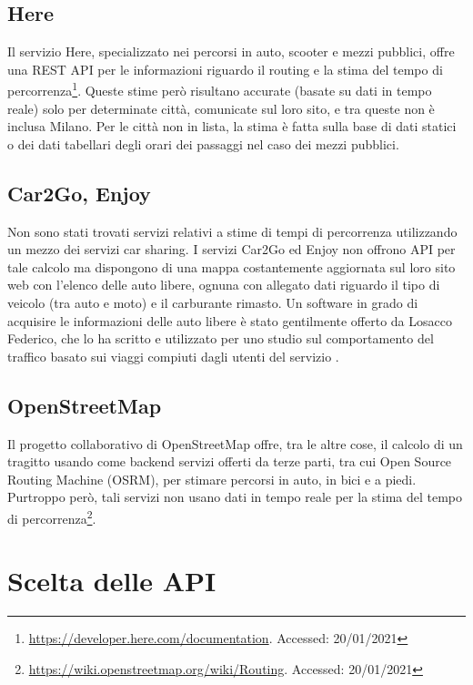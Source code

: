 \subsection{Here}

Il servizio Here, specializzato nei percorsi in auto, scooter e mezzi pubblici, offre una REST API per le informazioni riguardo il routing e la stima del tempo di percorrenza\footnote{\url{https://developer.here.com/documentation}. Accessed: 20/01/2021}. Queste stime però risultano accurate (basate su dati in tempo reale) solo per determinate città, comunicate sul loro sito, e tra queste non è inclusa Milano. Per le città non in lista, la stima è fatta sulla base di dati statici o dei dati tabellari degli orari dei passaggi nel caso dei mezzi pubblici.

\subsection{Car2Go, Enjoy}

Non sono stati trovati servizi relativi a stime di tempi di percorrenza utilizzando un mezzo dei servizi car sharing. I servizi Car2Go ed Enjoy non offrono API per tale calcolo ma dispongono di una mappa costantemente aggiornata sul loro sito web con l'elenco delle auto libere, ognuna con allegato dati riguardo il tipo di veicolo (tra auto e moto) e il carburante rimasto. Un software in grado di acquisire le informazioni delle auto libere è stato gentilmente offerto da Losacco Federico, che lo ha scritto e utilizzato per uno studio sul comportamento del traffico basato sui viaggi compiuti dagli utenti del servizio \cite{trentini2017sampling}.

\subsection{OpenStreetMap}

Il progetto collaborativo di OpenStreetMap offre, tra le altre cose, il calcolo di un tragitto usando come backend servizi offerti da terze parti, tra cui Open Source Routing Machine (OSRM), per stimare percorsi in auto, in bici e a piedi. Purtroppo però, tali servizi non usano dati in tempo reale per la stima del tempo di percorrenza\footnote{\url{https://wiki.openstreetmap.org/wiki/Routing}. Accessed: 20/01/2021}.

\section{Scelta delle API}

